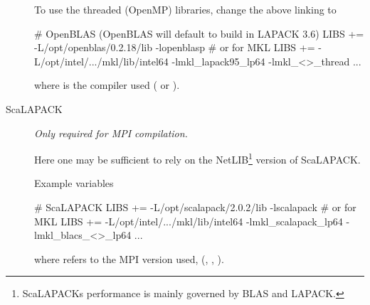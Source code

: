 \begin{description}
  To use the threaded (OpenMP) libraries, change the above linking
  to
\begin{shellexample}
  # OpenBLAS (OpenBLAS will default to build in LAPACK 3.6)
  LIBS += -L/opt/openblas/0.2.18/lib -lopenblasp
  # or for MKL
  LIBS += -L/opt/intel/.../mkl/lib/intel64 -lmkl_lapack95_lp64
    -lmkl_<>_thread ...
\end{shellexample}
  where \shell{<>} is the compiler used ( or ).


  \item[ScaLAPACK]%
  \emph{Only required for MPI compilation.}

  Here one may be sufficient to rely on the NetLIB\footnote{ScaLAPACKs
      performance is mainly governed by BLAS and LAPACK.} version of
  ScaLAPACK. 

  Example variables
\begin{shellexample}
  # ScaLAPACK
  LIBS += -L/opt/scalapack/2.0.2/lib -lscalapack
  # or for MKL
  LIBS += -L/opt/intel/.../mkl/lib/intel64 -lmkl_scalapack_lp64 
           -lmkl_blacs_<>_lp64 ...
\end{shellexample}
where \shell{<>} refers to the MPI version used, (,
, ).


\end{description}

